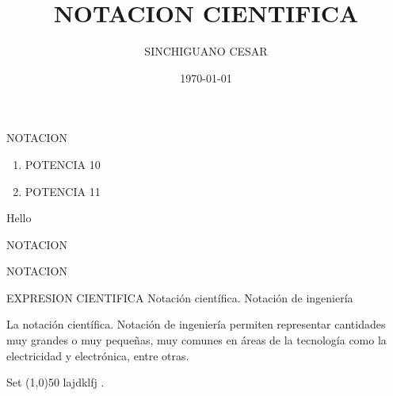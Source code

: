 \documentclass{beamer}
\title{NOTACION CIENTIFICA}
\author{SINCHIGUANO CESAR}
\institute{ULEAM}
\date{\today}
\begin{document}

\maketitle


\begin{frame}[t]{NOTACION}\vspace{10pt}
\begin{enumerate}
\item POTENCIA 10

\item POTENCIA 11
\end{enumerate}
Hello
\end{frame}




\begin{frame}[t]{NOTACION}\vspace{10pt}

\end{frame}



\begin{frame}[t]{NOTACION}\vspace{4pt}
\begin{block}{EXPRESION CIENTIFICA}
\vspace{0.5em}
Notación científica. Notación de ingeniería

La notación científica. Notación de ingeniería permiten representar cantidades muy grandes o muy pequeñas, muy comunes en áreas de la tecnología como la electricidad y electrónica, entre otras.




\vspace{0.5em}


\end{block}	
\vspace{10pt}
Set \line(1,0){50} lajdklfj . \\[10pt]
	
\end{frame}
\end{document}
